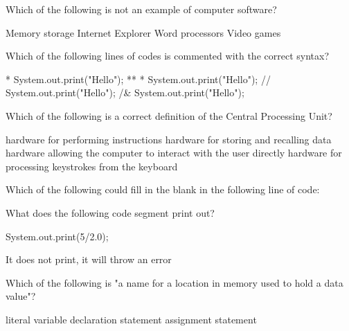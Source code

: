 \documentclass[answers,addpoints]{exam} %
\begin{document}
\begin{questions}

\question[2] Which of the following is not an example of computer software?
\begin{choices}
    \CorrectChoice Memory storage
    \choice Internet Explorer
    \choice Word processors
    \choice Video games
\end{choices}

\question[2] Which of the following lines of codes is commented with the correct syntax? 
\begin{choices}
    \choice ** System.out.print("Hello"); **
    \choice ** System.out.print("Hello");
    \CorrectChoice // System.out.print("Hello");
    \choice /\& System.out.print("Hello");
\end{choices}

\question[2] Which of the following is a correct definition of the Central Processing Unit?
\begin{choices}
    \CorrectChoice hardware for performing instructions
    \choice hardware for storing and recalling data
    \choice hardware allowing the computer to interact with the user directly
    \choice hardware for processing keystrokes from the keyboard
\end{choices}

\question[2] Which of the following could fill in the blank in the following line of code:
    \begin{center}
    \end{center}
\begin{choices}
    \choice {}
    \CorrectChoice {}
    \choice {}
    \choice {}
\end{choices}

\question[2] What does the following code segment print out?
\begin{code}
    System.out.print(5/2.0);
\end{code}
\begin{choices}
    \choice It does not print, it will throw an error
\end{choices}

\question[2] Which of the following is "a name for a location in memory used to hold a data value"?
\begin{choices}
    \choice literal
    \CorrectChoice variable
    \choice declaration statement
    \choice assignment statement
\end{choices}


\end{questions}
\end{document}
